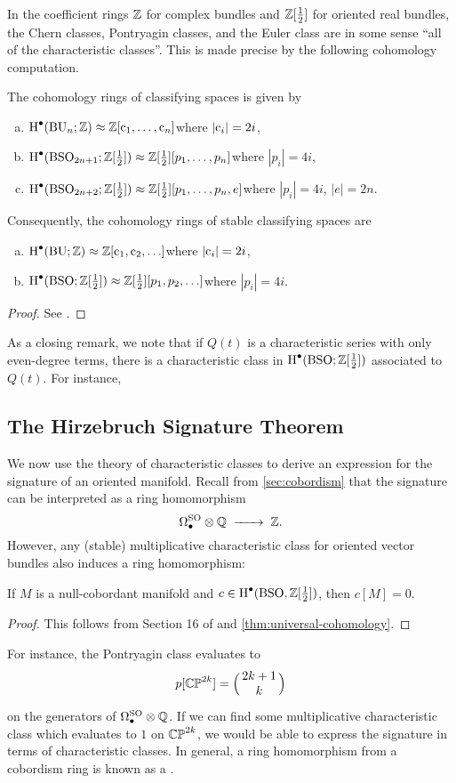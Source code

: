 In the coefficient rings $\mathbb{Z}$ for complex bundles and $\mathbb{Z}[\frac12]$ for oriented real bundles, the Chern classes, Pontryagin classes, and the Euler class are in some sense ``all of the characteristic classes''. This is made precise by the following cohomology computation.

\begin{theorem}\label{thm:universal-cohomology}
	The cohomology rings of classifying spaces is given by
	\begin{enumerate}[(a)]
		\item $\operatorname{H}^\bullet(\mathrm{BU}_n;\mathbb{Z})\approx \mathbb{Z}[\mathrm{c}_1,\ldots, \mathrm{c}_n]$\hfill where $|\mathrm{c}_i|=2i$,
		\item $\operatorname{H}^\bullet(\mathrm{BSO}_{2n+1};\mathbb{Z}[\frac12])\approx \mathbb{Z}[\frac12][p_1,\ldots, p_n]$\hfill where $|p_i|=4i$,
		\item $\operatorname{H}^\bullet(\mathrm{BSO}_{2n+2};\mathbb{Z}[\frac12])\approx \mathbb{Z}[\frac12][p_1,\ldots, p_n, e]$\hfill where $|p_i|=4i$, $|e|=2n$.
	\end{enumerate}
	Consequently, the cohomology rings of stable classifying spaces are 
	\begin{enumerate}[(a)]
		\item $\operatorname{H}^\bullet(\mathrm{BU};\mathbb{Z})\approx \mathbb{Z}[\mathrm{c}_1,\mathrm{c}_2,\ldots]$\hfill where $|\mathrm{c}_i|=2i$,
		\item $\operatorname{H}^\bullet(\mathrm{BSO};\mathbb{Z}[\frac12])\approx \mathbb{Z}[\frac12][p_1,p_2,\ldots]$\hfill where $|p_i|=4i$.
	\end{enumerate}
\end{theorem}
\begin{proof}
	See \cite{toda1987}.
\end{proof}

As a closing remark, we note that if $Q(t)$ is a characteristic series with only even-degree terms, there is a characteristic class in $\operatorname{H}^\bullet(\mathrm{BSO}; \mathbb{Z}[\frac12])$ associated to $Q(t)$. For instance,

\subsection{The Hirzebruch Signature Theorem}

We now use the theory of characteristic classes to derive an expression for the signature of an oriented manifold. Recall from \cref{sec:cobordism} that the signature can be interpreted as a ring homomorphism
\[
		\Omega_\bullet^\SO \otimes \Q \lkxto \Z.
\]
However, any (stable) multiplicative characteristic class for oriented vector bundles also induces a ring homomorphism:
\begin{proposition}
	If $M$ is a null-cobordant manifold and $c\in \operatorname{H}^\bullet(\mathrm{BSO}, \mathbb{Z}[\frac12])$, then $c[M]=0$.
\end{proposition}
\begin{proof}
	This follows from Section 16 of \cite{milnorstasheff1974} and \cref{thm:universal-cohomology}.
\end{proof}
For instance, the Pontryagin class evaluates to
\[
		p[\CP^{2k}] = \binom{2k+1}{k}
\]
on the generators of $\Omega_\bullet^{\mathrm{SO}}\otimes \mathbb{Q}$. If we can find some multiplicative characteristic class which evaluates to $1$ on $\mathbb{CP}^{2k}$, we would be able to express the signature in terms of characteristic classes. In general, a ring homomorphism from a cobordism ring is known as a .

